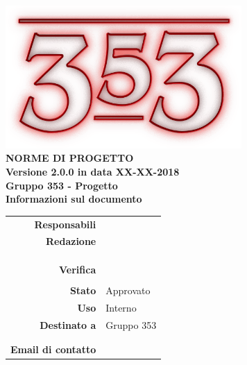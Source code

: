 \documentclass[openany, a4paper, 12pt]{report}
\begin{document}
\begin{titlepage}
	\centering
	\vfill
	{
		\bfseries
		\vskip2cm
		\includegraphics[width=9cm]{../../common/images/logo.png} \\
		\vfill
		\Huge{NORME DI PROGETTO}\\
		\vfill
		\Large Versione 2.0.0 in data XX-XX-2018\\ %
		\large Gruppo 353 - Progetto \progetto \\
		\vfill
		\normalsize Informazioni sul documento\\
		\begin{table}[htbp]
			\centering
			\renewcommand\arraystretch{1.2}
			\begin{tabular}{r|l}
				\hline
				\textbf{Responsabili}	& \Valentina \\
								
														
				\textbf{Redazione} 		& \Davide \\
										& \Mirco \\
										& \Riccardo \\
										& \Parwinder \\
										
				\textbf{Verifica} 		& \Elena \\
										& \Gianluca \\	
				
				\textbf{Stato} 			& Approvato \\
				\textbf{Uso}			& Interno \\
				\textbf{Destinato a}   	& Gruppo 353 \\
										& \Vardanega \\
										& \Cardin \\
				
				\textbf{Email di contatto}	& \mailgroup
			\end{tabular}
		\end{table}
		\vfill
	}    
\end{titlepage}

\tableofcontents
\newpage
{}




\appendix



 
\end{document}
